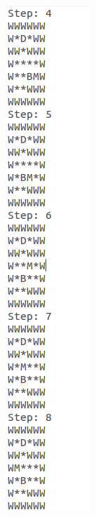 \documentclass[10pt, letter]{article}
\begin{document}
\begin{figure} [h!]
\begin{subfigure}{.3\textwidth}
  \includegraphics[scale = 0.35]{images/sokoban1-ans2}
\end{subfigure}%
\begin{subfigure}{.3\textwidth}
  \centering

\end{subfigure}
\end{figure}
\end{document}
